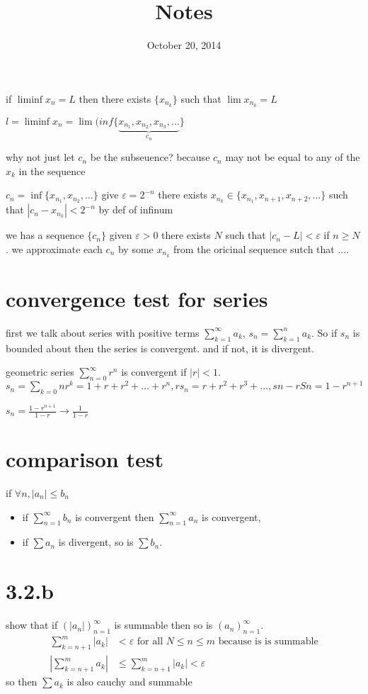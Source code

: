 \documentclass[letterpaper]{article}
\begin{document}
\title{Notes}
\date{October 20, 2014}
\maketitle
if $\liminf x_n=L$ then there exists $\{x_{n_k}\}$ such that $\lim x_{n_k}=L$

$l=\liminf x_n=\lim(inf\{\underbrace{x_{n_1},x_{n_2},x_{n_3},\dots}_{c_n}\}$

why not just let $c_n$ be the subseuence? because $c_n$ may not be equal to any of the $x_k$ in the sequence

$c_n=\inf\{x_{n_1},x_{n_2},\dots\}$ give $\varepsilon=2^{-n}$ there exists $x_{n_k}\in\{x_{n_1},x_{n+1},x_{n+2},\dots\}$ such that $\left\lvert c_n-x_{n_k}\right\rvert<2^{-n}$ by def of infinum

we has a sequence $\{c_n\}$ given $\varepsilon>0$ there exists $N$ such that $\left\lvert c_n-L\right\rvert<\varepsilon$ if $n\ge N$. we approximate each $c_n$ by some $x_{n_k}$ from the oricinal sequence sutch that ....

\section*{convergence test for series}
first we talk about series with positive terms $\sum\limits_{k=1}^\infty{a_k}$, $s_n=\sum\limits_{k=1}^n{a_k}$. So if $s_n$ is bounded about then the series is convergent. and if not, it is divergent.

geometric series $\sum\limits_{n=0}^\infty{r^n}$ is convergent if $\left\lvert r\right\rvert<1$. $s_n=\sum\limits_{k=0}n{r^k}=1+r+r^2+\dots+r^n, rs_n=r+r^2+r^3+\dots, sn-rSn=1-r^{n+1}$

$s_n=\frac{1-r^{n+1}}{1-r}\to\frac{1}{1-r}$


\section*{comparison test}
if $\forall n, |a_n|\le b_n$
\begin{itemize}
\item
  if $\sum\limits_{n=1}^\infty{b_n}$ is convergent then $\sum\limits_{n=1}^\infty{a_n}$ is convergent,
  \item
  if $\sum\limits{a_n}$ is divergent, so is $\sum\limits{b_n}$.
\end{itemize}
\section*{3.2.b}
show that if $\left(|a_n|\right)_{n=1}^\infty$ is summable then so is $\left(a_n\right)_{n=1}^\infty$.
\begin{align*}
  \sum\limits_{k=n+1}^m{|a_k|}&<\varepsilon\text{ for all }N\le n\le m \text{ because is is summable}\\
  \left\lvert\sum\limits_{k=n+1}^m{a_k}\right\rvert&\le\sum\limits_{k=n+1}^m{|a_k|}<\varepsilon
\end{align*}
so then $\sum\limits{a_k}$ is also cauchy and summable
\end{document}
